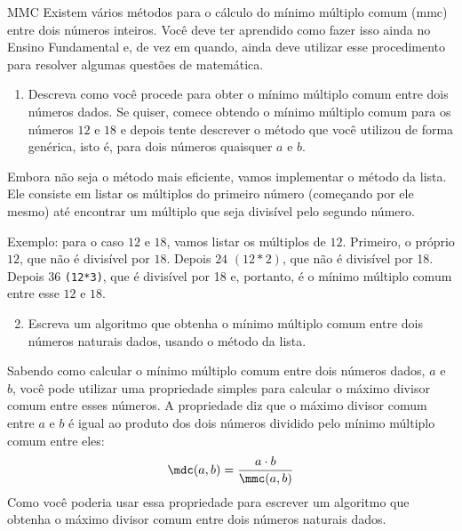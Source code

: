 \begin{task}{MMC}
Existem vários métodos para o cálculo do mínimo múltiplo comum (mmc) entre dois números inteiros. Você deve ter aprendido como fazer isso ainda no Ensino Fundamental e, de vez em quando, ainda deve utilizar esse procedimento para resolver algumas questões de matemática.

\begin{enumerate}
\item Descreva como você procede para obter o mínimo múltiplo comum entre dois números dados. Se quiser, comece obtendo o mínimo múltiplo comum para os números $12$ e $18$ e depois tente descrever o método que você utilizou de forma genérica, isto é, para dois números quaisquer $a$ e $b$.
\end{enumerate}
Embora não seja o método mais eficiente, vamos implementar o método da lista. Ele consiste em listar os múltiplos do primeiro número (começando por ele mesmo) até encontrar um múltiplo que seja divisível pelo segundo número.

Exemplo: para o caso $12$ e $18$, vamos listar os múltiplos de $12$. Primeiro, o próprio $12$, que não é divisível por $18$. Depois $24$ $(12*2)$, que não é divisível por 18. Depois $36$ \verb|(12*3)|, que é divisível por 18 e, portanto, é o mínimo múltiplo comum entre esse $12$ e $18$.

\begin{enumerate}
\setcounter{enumi}{1}
\item Escreva um algoritmo que obtenha o mínimo múltiplo comum entre dois números naturais dados, usando o método da lista.
\end{enumerate}

\end{task}

\begin{reflection}
Sabendo como calcular o mínimo múltiplo comum entre dois números dados, $a$ e $b$, você pode utilizar uma propriedade simples para calcular o máximo divisor comum entre esses números. A propriedade diz que o máximo divisor comum entre $a$ e $b$ é igual ao produto dos dois números dividido pelo mínimo múltiplo comum entre eles:
 \begin{equation*}
\mdc(a,b)=\frac{a\cdot b}{\mmc(a,b)}
\end{equation*}
Como você poderia usar essa propriedade para escrever um algoritmo que obtenha o máximo divisor comum entre dois números naturais dados.
\end{reflection}


